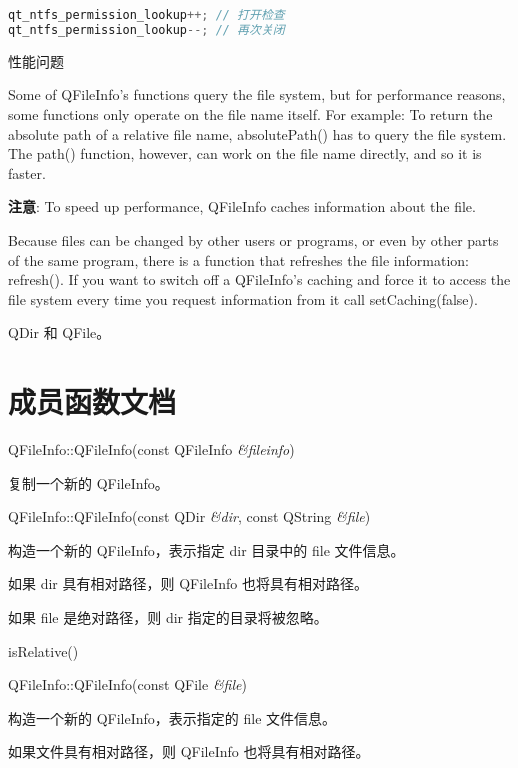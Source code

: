 \begin{lstlisting}[language=C++]
qt_ntfs_permission_lookup++; // 打开检查
qt_ntfs_permission_lookup--; // 再次关闭
\end{lstlisting}

性能问题

Some of QFileInfo's functions query the file system, but for performance reasons, some functions only operate on the file name itself. For example: To return the absolute path of a relative file name, absolutePath() has to query the file system. The path() function, however, can work on the file name directly, and so it is faster.

\textbf{注意}: To speed up performance, QFileInfo caches information about the file.

Because files can be changed by other users or programs, or even by other parts of the same program, there is a function that refreshes the file information: refresh(). If you want to switch off a QFileInfo's caching and force it to access the file system every time you request information from it call setCaching(false).


\begin{notice}[另请参阅]
QDir 和 QFile。
\end{notice}

\splitLine 

\section{成员函数文档}

QFileInfo::QFileInfo(const QFileInfo \emph{\&fileinfo})

复制一个新的 QFileInfo。

QFileInfo::QFileInfo(const QDir \emph{\&dir}, const QString \emph{\&file})

构造一个新的 QFileInfo，表示指定 dir 目录中的 file 文件信息。

如果 dir 具有相对路径，则 QFileInfo 也将具有相对路径。

如果 file 是绝对路径，则 dir 指定的目录将被忽略。

\begin{notice}[另请参阅]
 isRelative()
\end{notice}


QFileInfo::QFileInfo(const QFile \emph{\&file})

构造一个新的 QFileInfo，表示指定的 file 文件信息。

如果文件具有相对路径，则 QFileInfo 也将具有相对路径。

